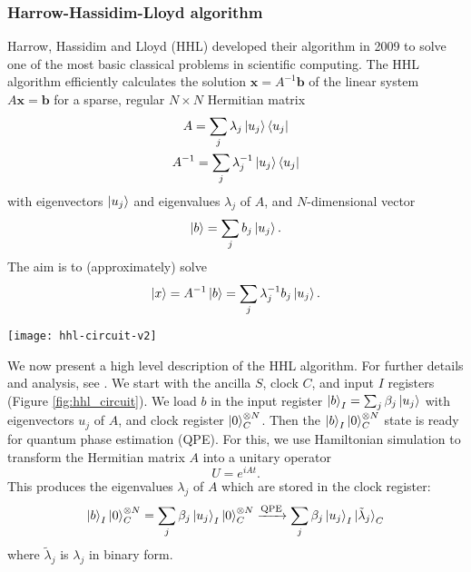 \documentclass[10pt]{iopart}
\begin{document}

\subsubsection{Harrow-Hassidim-Lloyd algorithm}\label{sssec:HHL}\hfill

Harrow, Hassidim and Lloyd (HHL) developed their algorithm in 2009 \cite{Harrow2009} to solve one of the most basic classical problems in scientific computing. The HHL algorithm efficiently calculates the solution $\mathbf{x} = A^{-1}\mathbf{b}$ of the linear system $A\mathbf{x} = \mathbf{b}$ for a sparse, regular $N \times N$ Hermitian matrix 
\begin{gather}
A = \sum_j \lambda_j\ket{u_j}\bra{u_j} \\
A^{-1} = \sum_j \lambda_j^{-1}\ket{u_j}\bra{u_j}
\end{gather}
with eigenvectors $\ket{u_j}$ and eigenvalues $\lambda_j$ of $A$, and $N$-dimensional vector 
\begin{equation}
\ket{b} = \sum_j b_j\ket{u_j}.
\end{equation}
The aim is to (approximately) solve
\begin{equation}
\ket{x} = A^{-1} \ket{b} = \sum_j \lambda_j^{-1}b_j\ket{u_j}.
\end{equation}

\begin{figure*}[ht!]
\centering
\texttt{[image: hhl-circuit-v2]}
\caption{High level HHL circuit. Adapted from \cite{Dervovic2018}.}
\label{fig:hhl_circuit}
\end{figure*}

We now present a high level description of the HHL algorithm. For further details and analysis, see \cite{Dervovic2018,Abhijith2022}. We start with the ancilla $S$, clock $C$, and input $I$ registers (Figure \ref{fig:hhl_circuit}). We load $b$ in the input register $\ket{b}_I = \sum_j \beta_j \ket{u_j}$ with eigenvectors $u_j$ of $A$, and clock register $\ket{0}^{\otimes N}_C$. Then the $\ket{b}_I \ket{0}^{\otimes N}_C$ state is ready for quantum phase estimation (QPE). For this, we use Hamiltonian simulation to transform the Hermitian matrix $A$ into a unitary operator
\begin{equation}
U = e^{iAt}.
\end{equation}
This produces the eigenvalues $\lambda_j$ of $A$ which are stored in the clock register:
\begin{equation}
\ket{b}_I \ket{0}^{\otimes N}_C = 
\sum_j \beta_j \ket{u_j}_I \ket{0}^{\otimes N}_C
\xrightarrow[]{\text{QPE}}
\sum_j \beta_j \ket{u_j}_I \ket{\tilde{\lambda}_j}_C
\end{equation}
where $\tilde{\lambda}_j$ is $\lambda_j$ in binary form.
\end{document}
